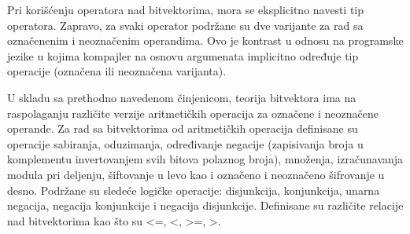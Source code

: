 \documentclass[12pt,oneside]{memoir}
\begin{document}
Pri korišćenju operatora nad bitvektorima, mora se eksplicitno navesti tip operatora. Zapravo, za svaki operator podržane su dve varijante za rad sa označenenim i neoznačenim operandima. Ovo je kontrast u odnosu na programske jezike u kojima kompajler na osnovu argumenata implicitno određuje tip operacije (označena ili neoznačena varijanta).
\par
U skladu sa prethodno navedenom činjenicom, teorija bitvektora ima na raspolaganju različite verzije aritmetičkih operacija za označene i neoznačene operande. Za rad sa bitvektorima od aritmetičkih operacija definisane su operacije sabiranja, oduzimanja, određivanje negacije (zapisivanja broja u komplementu invertovanjem svih bitova polaznog broja), množenja, izračunavanja modula pri deljenju, šiftovanje u levo kao i označeno i neoznačeno šifrovanje u desno. Podržane su sledeće logičke operacije: disjunkcija, konjunkcija, unarna negacija, negacija konjunkcije i negacija disjunkcije. Definisane su različite relacije nad bitvektorima kao što su <=, <, >=, >.
\end{document}
